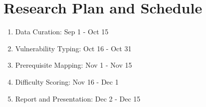 \section{Research Plan and Schedule}
\done{}

\begin{enumerate}
    \item Data Curation: Sep 1 - Oct 15
    
    \item Vulnerability Typing: Oct 16 - Oct 31
    
    \item Prerequisite Mapping: Nov 1 - Nov 15
    
    \item Difficulty Scoring: Nov 16 - Dec 1
    
    \item Report and Presentation: Dec 2 - Dec 15
\end{enumerate}